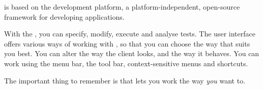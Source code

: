 

\app{} is based on the  development platform,  a
 platform-independent, open-source framework for developing applications. 

With the \ite{}, you can specify, modify, execute and analyse tests. 
The user interface offers various ways of working with \app{}, so that you can choose the way that suits you best. You can alter the way the client looks, and the way it behaves. You can work using the menu bar, the tool bar, context-sensitive menus and shortcuts.  

The important thing to remember is that \app{} lets you work the way \emph{you} want to. 
 
